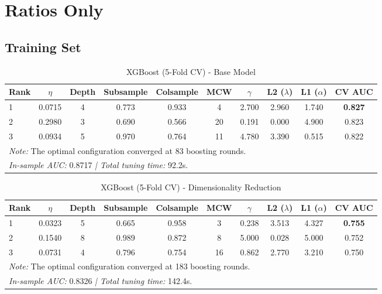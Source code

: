 \documentclass{report}\usepackage[]{graphicx}\usepackage[]{xcolor}
\begin{document}
\section{Ratios Only}

\subsection{Training Set}

\begin{table}[h]
    \centering
    \caption{XGBoost (5-Fold CV) - Base Model}
    \label{tab:xgb_leaderboard}
    \begin{tabular}{lccccccccc}
        \hline
        \textbf{Rank} & \textbf{$\eta$} & \textbf{Depth} & \textbf{Subsample} & \textbf{Colsample} & \textbf{MCW} & \textbf{$\gamma$} & \textbf{L2 ($\lambda$)} & \textbf{L1 ($\alpha$)} & \textbf{CV AUC} \\
        \hline
        1 & 0.0715 & 4 & 0.773 & 0.933 & 4  & 2.700 & 2.960 & 1.740 & \textbf{0.827} \\
        2 & 0.2980 & 3 & 0.690 & 0.566 & 20 & 0.191 & 0.000 & 4.900 & 0.823 \\
        3 & 0.0934 & 5 & 0.970 & 0.764 & 11 & 4.780 & 3.390 & 0.515 & 0.822 \\
        \hline
        \multicolumn{10}{l}{\footnotesize \textit{Note:} The optimal configuration converged at 83 boosting rounds.} \\
        \multicolumn{10}{l}{\footnotesize \textit{In-sample AUC:} 0.8717 \textit{ | Total tuning time:} 92.2s.} \\
    \end{tabular}
\end{table}

\begin{table}[h]
    \centering
    \caption{XGBoost (5-Fold CV) - Dimensionality Reduction}
    \label{tab:xgb_leaderboard_updated}
    \begin{tabular}{lccccccccc}
        \hline
        \textbf{Rank} & \textbf{$\eta$} & \textbf{Depth} & \textbf{Subsample} & \textbf{Colsample} & \textbf{MCW} & \textbf{$\gamma$} & \textbf{L2 ($\lambda$)} & \textbf{L1 ($\alpha$)} & \textbf{CV AUC} \\
        \hline
        1 & 0.0323 & 5 & 0.665 & 0.958 & 3 & 0.238 & 3.513 & 4.327 & \textbf{0.755} \\
        2 & 0.1540 & 8 & 0.989 & 0.872 & 8 & 5.000 & 0.028 & 5.000 & 0.752 \\
        3 & 0.0731 & 4 & 0.796 & 0.754 & 16 & 0.862 & 2.770 & 3.210 & 0.750 \\
        \hline
        \multicolumn{10}{l}{\footnotesize \textit{Note:} The optimal configuration converged at 183 boosting rounds.} \\
        \multicolumn{10}{l}{\footnotesize \textit{In-sample AUC:} 0.8326 \textit{ | Total tuning time:} 142.4s.} \\
    \end{tabular}
\end{table}
\end{document}
